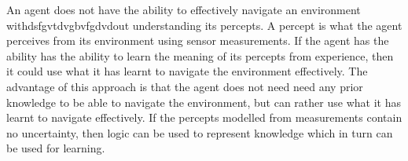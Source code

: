 
An agent does not have the ability to effectively navigate an environment withdsfgvtdvgbvfgdvdout understanding its percepts. A percept is what the agent perceives from its environment using sensor measurements. If the agent has the ability has the ability to learn the meaning of its percepts from experience, then it could use what it has learnt to navigate the environment effectively. The advantage of this approach is that the agent does not need need any prior knowledge to be able to navigate the environment, but can rather use what it has learnt to navigate effectively. If the percepts modelled from measurements contain no uncertainty, then logic can be used to represent knowledge which in turn can be used for learning.







